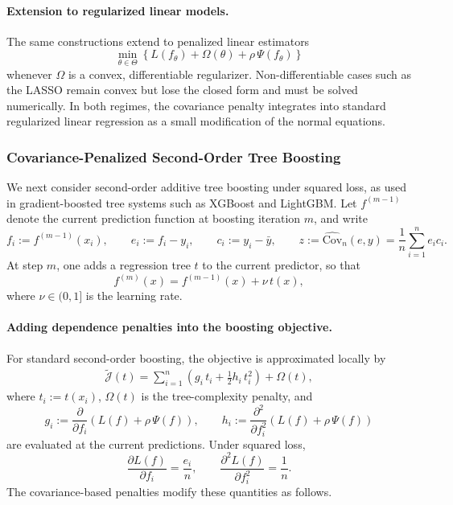 \documentclass{article}
\theoremstyle{plain}
\theoremstyle{definition}
\newcommand{\1}{\mathbf{1}}
\newcommand{\Cov}{\text{Cov}}
\begin{document}
\paragraph{Extension to regularized linear models.}
The same constructions extend to penalized linear estimators
\[
\min_{\theta\in\Theta}
\left\{
    L(f_\theta) + \Omega(\theta) + \rho\,\Psi(f_\theta)
\right\}
\]
whenever $\Omega$ is a convex, differentiable regularizer. Non-differentiable cases such as the LASSO remain convex but lose the closed form and must be solved numerically. In both regimes, the covariance penalty integrates into standard regularized linear regression as a small modification of the normal equations.

\subsubsection{Covariance-Penalized Second-Order Tree Boosting}
\label{subsec:tree_boosting}

We next consider second-order additive tree boosting under squared loss, as used in gradient-boosted tree systems such as XGBoost and LightGBM. Let \(f^{(m-1)}\) denote the current prediction function at boosting iteration \(m\), and write
\[
f_i := f^{(m-1)}(x_i),
\qquad
e_i := f_i - y_i,
\qquad
c_i := y_i - \bar y,
\qquad
z := \widehat{\Cov}_n(e,y) = \frac{1}{n}\sum_{i=1}^n e_i c_i.
\]
At step \(m\), one adds a regression tree \(t\) to the current predictor, so that
\[
f^{(m)}(x) = f^{(m-1)}(x) + \nu\,t(x),
\]
where \(\nu\in(0,1]\) is the learning rate.

\paragraph{Adding dependence penalties into the boosting objective.}
For standard second-order boosting, the objective is approximated locally by
\begin{align}
    \label{eq:boosting_local_objective}
    \widetilde{\mathcal J}(t)
    =
    \sum_{i=1}^n
    \left(
        g_i\,t_i + \frac{1}{2}h_i\,t_i^2
    \right)
    +
    \Omega(t),
\end{align}
where \(t_i := t(x_i)\), \(\Omega(t)\) is the tree-complexity penalty, and
\[
g_i := \frac{\partial}{\partial f_i}
\left(
L(f) + \rho\,\Psi(f)
\right),
\qquad
h_i := \frac{\partial^2}{\partial f_i^2}
\left(
L(f) + \rho\,\Psi(f)
\right)
\]
are evaluated at the current predictions. Under squared loss,
\[
\frac{\partial L(f)}{\partial f_i} = \frac{e_i}{n},
\qquad
\frac{\partial^2 L(f)}{\partial f_i^2} = \frac{1}{n}.
\]
The covariance-based penalties modify these quantities as follows.
\end{document}
